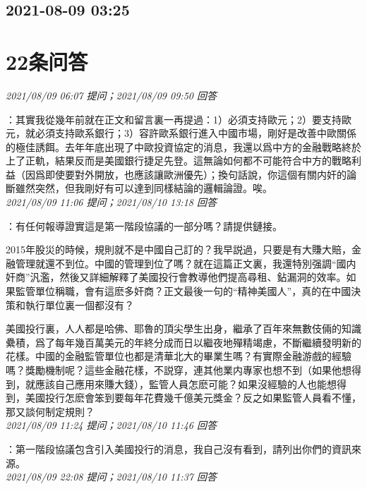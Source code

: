 \documentclass[twocolumn]{ctexart}
\begin{document}
\subsection{2021-08-09 03:25}


\section{22条问答}

\textit{\hfill\noindent\small 2021/08/09 06:07 提问；2021/08/09 09:50 回答}

：其實我從幾年前就在正文和留言裏一再提過：1）必須支持歐元；2）要支持歐元，就必須支持歐系銀行；3）容許歐系銀行進入中國市場，剛好是改善中歐關係的極佳誘餌。去年年底出現了中歐投資協定的消息，我還以爲中方的金融戰略終於上了正軌，結果反而是美國銀行捷足先登。這無論如何都不可能符合中方的戰略利益（因爲即使要對外開放，也應該讓歐洲優先）；換句話說，你這個有關内奸的論斷雖然突然，但我剛好有可以達到同樣結論的邏輯論證。唉。
\\

\textit{\hfill\noindent\small 2021/08/09 11:06 提问；2021/08/10 13:18 回答}

：有任何報導證實這是第一階段協議的一部分嗎？請提供鏈接。

2015年股災的時候，規則就不是中國自己訂的？我早説過，只要是有大賺大賠，金融管理就還不到位。中國的管理到位了嗎？就在這篇正文裏，我還特別强調“國内奸商”汎濫，然後又詳細解釋了美國投行會教導他們提高尋租、鉆漏洞的效率。如果監管單位稱職，會有這麽多奸商？正文最後一句的“精神美國人”，真的在中國決策和執行單位裏一個都沒有？

美國投行裏，人人都是哈佛、耶魯的頂尖學生出身，繼承了百年來無數伎倆的知識纍積，爲了每年幾百萬美元的年終分成而日以繼夜地殫精竭慮，不斷繼續發明新的花樣。中國的金融監管單位也都是清華北大的畢業生嗎？有實際金融游戲的經驗嗎？獎勵機制呢？這些金融花樣，不説穿，連其他業内專家也想不到（如果他想得到，就應該自己應用來賺大錢），監管人員怎麽可能？如果沒經驗的人也能想得到，美國投行怎麽會笨到要每年花費幾千億美元獎金？反之如果監管人員看不懂，那又談何制定規則？
\\

\textit{\hfill\noindent\small 2021/08/09 11:24 提问；2021/08/10 11:46 回答}

：第一階段協議包含引入美國投行的消息，我自己沒有看到，請列出你們的資訊來源。
\\

\textit{\hfill\noindent\small 2021/08/09 22:08 提问；2021/08/10 11:37 回答}
\end{document}
